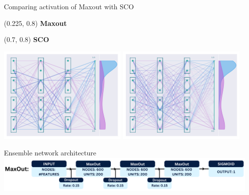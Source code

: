 \documentclass[UKenglish]{beamer}
\begin{document}
\begin{frame}{Comparing activation of Maxout with SCO}
    \begin{textblock}{0.8}(0.225, 0.8)
        \textbf{Maxout}
    \end{textblock}
    \begin{textblock}{0.8}(0.7, 0.8)
        \textbf{SCO}
    \end{textblock}
    \vfill
    \begin{center}
        \includegraphics[width = 0.475\textwidth]{figures/NetworkVis/AfterTraining.pdf}
        \includegraphics[width = 0.475\textwidth]{figures/NetworkVis/SCO/AfterTraining.pdf}
    \end{center}
\end{frame}
\begin{frame}{Ensemble network architecture}
    \vfill
    \includegraphics[width = 0.98\textwidth]{figures/maxout.png}
\end{frame}
\end{document}
